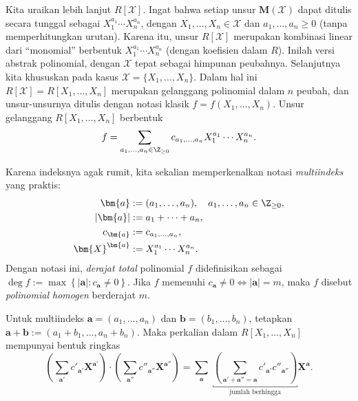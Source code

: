 Kita uraikan lebih lanjut $R[\mathcal{X}]$. Ingat bahwa setiap unsur $\mathbf{M}(\mathcal{X})$ dapat ditulis secara tunggal sebagai $X_1^{a_1} \cdots X_n^{a_n}$, dengan $X_1, \ldots, X_n \in \mathcal{X}$ dan $a_1, \ldots, a_n \geq 0$ (tanpa memperhitungkan urutan). Karena itu, unsur $R[\mathcal{X}]$ merupakan kombinasi linear dari ``monomial'' berbentuk $X_1^{a_1} \cdots X_n^{a_n}$ (dengan koefisien dalam $R$). Inilah versi abstrak polinomial, dengan $\mathcal{X}$ tepat sebagai himpunan peubahnya. Selanjutnya kita khususkan pada kasus $\mathcal{X} = \{X_1, \ldots, X_n\}$. Dalam hal ini $R[\mathcal{X}] = R[X_1, \ldots, X_n]$ merupakan gelanggang polinomial dalam $n$ peubah, dan unsur-unsurnya ditulis dengan notasi klasik $f = f(X_1, \ldots, X_n)$. Unsur gelanggang $R[X_1, \ldots, X_n]$ berbentuk
\[ f = \sum_{a_1, \ldots, a_n \in \Z_{\geq 0}} c_{a_1, \ldots, a_n} X_1^{a_1} \cdots X_n^{a_n}. \]

Karena indeksnya agak rumit, kita sekalian memperkenalkan notasi \emph{multiindeks} yang praktis:
\begin{align*}
	\bm{a} & := (a_1, \ldots, a_n), \quad a_1, \ldots, a_n \in \Z_{\geq 0}, \\
	|\bm{a}| & := a_1 + \cdots + a_n, \\
	c_{\bm{a}} & := c_{a_1, \ldots, a_n}, \\
	\bm{X}^{\bm{a}} & := X_1^{a_1} \cdots X_n^{a_n}.
\end{align*}
Dengan notasi ini, \emph{derajat total} polinomial $f$ didefinisikan sebagai $\deg f := \max\left\{ |\bm{a}| : c_{\bm{a}}\neq 0 \right\}$. Jika $f$ memenuhi $c_{\bm{a}} \neq 0 \iff |\bm{a}|=m$, maka $f$ disebut \emph{polinomial homogen} berderajat $m$.

Untuk multiindeks $\bm{a} = (a_1, \ldots, a_n)$ dan $\bm{b} = (b_1, \ldots, b_n)$, tetapkan $\bm{a} + \bm{b} := (a_1 + b_1, \ldots, a_n + b_n)$. Maka perkalian dalam $R[X_1, \ldots, X_n]$ mempunyai bentuk ringkas
\begin{equation}\label{eqn:polynomial-multiplication}
	\left( \sum_{\bm{a}'} c'_{\bm{a}'} \bm{X}^{\bm{a}'} \right) \cdot \left( \sum_{\bm{a}''} c''_{\bm{a}''} \bm{X}^{\bm{a}''} \right) = \sum_{\bm{a}} \; \underbracket{ \left( \sum_{\bm{a}' + \bm{a}'' = \bm{a}} c'_{\bm{a}'} c''_{\bm{a}''} \right) }_{\text{jumlah berhingga}} \bm{X}^{\bm{a}}.
\end{equation}

